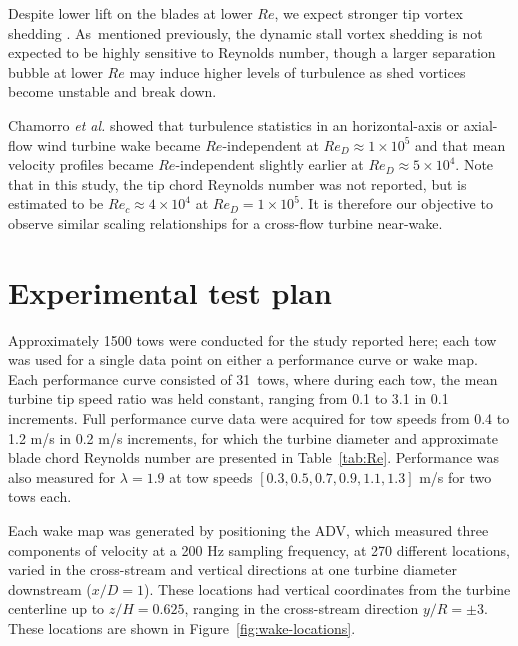 Despite lower lift on the blades at lower $Re$, we expect stronger tip vortex
shedding \cite{Yoon2005}. As~mentioned previously, the dynamic stall vortex
shedding is not expected to be highly sensitive to Reynolds number, though a
larger separation bubble at lower $Re$ may induce higher levels of turbulence as
shed vortices become unstable and break down.

Chamorro \emph{et al.} \cite{Chamorro2012} showed that turbulence statistics in
an horizontal-axis or axial-flow wind turbine wake became $Re$-independent at
$Re_D \approx 1 \times 10^5$ and that mean velocity profiles became
$Re$-independent slightly earlier at $Re_D \approx 5 \times 10^4$. Note that in
this study, the tip chord Reynolds number was not reported, but is estimated to
be $Re_c \approx 4 \times 10^4$ at $Re_D=1 \times 10^5$. It is therefore our
objective to observe similar scaling relationships for a cross-flow turbine
near-wake.


\section{Experimental test plan}

Approximately 1500 tows were conducted for the study reported here; each tow was
used for a single data point on either a performance curve or wake map. Each
performance curve consisted of 31~tows, where during each tow, the mean turbine
tip speed ratio was held constant, ranging from 0.1 to 3.1 in 0.1 increments.
Full performance curve data were acquired for tow speeds from 0.4 to 1.2 m/s in
0.2 m/s increments, for which the turbine diameter and approximate blade chord
Reynolds number are presented in Table~\ref{tab:Re}. Performance was also
measured for $\lambda=1.9$ at tow speeds $[0.3, 0.5, 0.7, 0.9, 1.1, 1.3]$ m/s
for two tows each.

Each wake map was generated by positioning the ADV, which measured three
components of velocity at a 200 Hz sampling frequency, at 270 different
locations, varied in the cross-stream and vertical directions at one turbine
diameter downstream ($x/D=1$). These locations had vertical coordinates from the
turbine centerline up to $z/H=0.625$, ranging in the cross-stream direction $y/R
= \pm 3$. These locations are shown in Figure~\ref{fig:wake-locations}.

